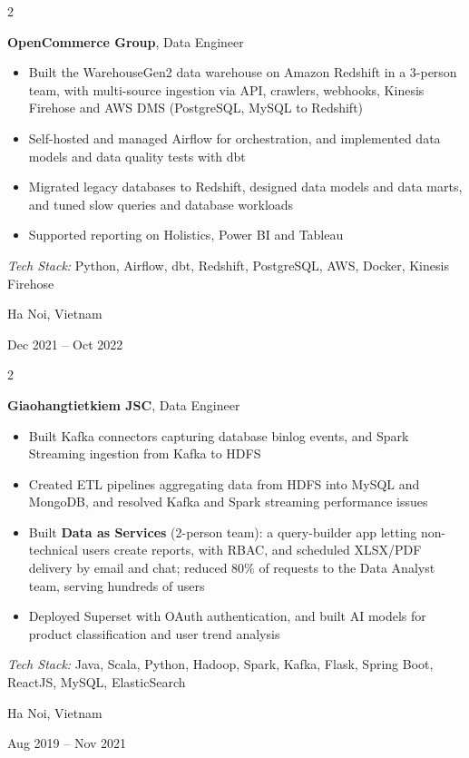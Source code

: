 \documentclass[10pt, letterpaper]{article}
\newenvironment{highlights}{
    \begin{itemize}[
        topsep=0.10 cm,
        parsep=0.10 cm,
        partopsep=0pt,
        itemsep=0pt,
        leftmargin=0.4 cm + 10pt
    ]
    }{
    \end{itemize}
} %
\newenvironment{twocolentry}[2][]{
    \onecolentry
    \def\secondColumn{#2}
    \setcolumnwidth{\fill, 4.5 cm}
    \begin{paracol}{2}
    }{
        \switchcolumn \raggedleft \secondColumn
    \end{paracol}
    \endonecolentry
} %
\begin{document}
    \vspace{0.2 cm}

    \begin{twocolentry}{
        Ha Noi, Vietnam

        Dec 2021 -- Oct 2022
    }
        \textbf{OpenCommerce Group}, Data Engineer
        \begin{highlights}
            \item Built the WarehouseGen2 data warehouse on Amazon Redshift in a 3-person team, with multi-source ingestion via API, crawlers, webhooks, Kinesis Firehose and AWS DMS (PostgreSQL, MySQL to Redshift)
            \item Self-hosted and managed Airflow for orchestration, and implemented data models and data quality tests with dbt
            \item Migrated legacy databases to Redshift, designed data models and data marts, and tuned slow queries and database workloads
            \item Supported reporting on Holistics, Power BI and Tableau
        \end{highlights}
        \textit{Tech Stack:} Python, Airflow, dbt, Redshift, PostgreSQL, AWS, Docker, Kinesis Firehose
    \end{twocolentry}

    \vspace{0.2 cm}

    \begin{twocolentry}{
        Ha Noi, Vietnam

        Aug 2019 -- Nov 2021
    }
        \textbf{Giaohangtietkiem JSC}, Data Engineer
        \begin{highlights}
            \item Built Kafka connectors capturing database binlog events, and Spark Streaming ingestion from Kafka to HDFS
            \item Created ETL pipelines aggregating data from HDFS into MySQL and MongoDB, and resolved Kafka and Spark streaming performance issues
            \item Built \textbf{Data as Services} (2-person team): a query-builder app letting non-technical users create reports, with RBAC, and scheduled XLSX/PDF delivery by email and chat; reduced 80\% of requests to the Data Analyst team, serving hundreds of users
            \item Deployed Superset with OAuth authentication, and built AI models for product classification and user trend analysis
        \end{highlights}
        \textit{Tech Stack:} Java, Scala, Python, Hadoop, Spark, Kafka, Flask, Spring Boot, ReactJS, MySQL, ElasticSearch
    \end{twocolentry}
\end{document}
